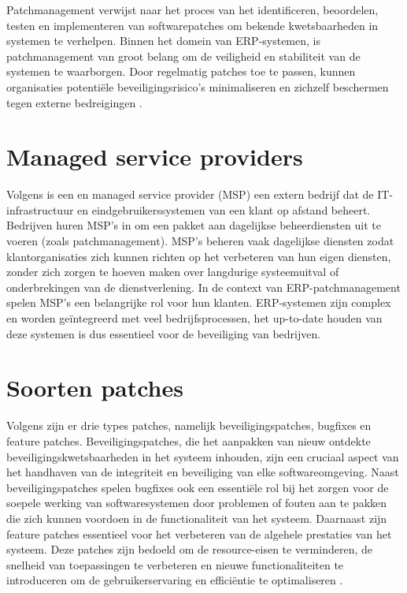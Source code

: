 Patchmanagement verwijst naar het proces van het identificeren, beoordelen, testen en implementeren van softwarepatches om bekende kwetsbaarheden in systemen te verhelpen. Binnen het domein van ERP-systemen, is patchmanagement van groot belang
om de veiligheid en stabiliteit van de systemen te waarborgen. Door regelmatig patches toe te passen, kunnen organisaties potentiële beveiligingsrisico's minimaliseren en zichzelf beschermen tegen externe bedreigingen \autocite{Buenning2024}.

\section{Managed service providers}

Volgens \textcite{Gillis2021} is een en managed service provider (MSP) een extern bedrijf dat de IT-infrastructuur en eindgebruikerssystemen van een klant op afstand beheert. Bedrijven huren MSP's in om een pakket aan dagelijkse beheerdiensten uit te voeren (zoals patchmanagement). MSP's beheren
vaak dagelijkse diensten zodat klantorganisaties zich kunnen richten op het verbeteren van hun eigen diensten, zonder zich zorgen te hoeven maken over langdurige systeemuitval of onderbrekingen van de dienstverlening.
In de context van ERP-patchmanagement spelen MSP's een belangrijke rol voor hun klanten. ERP-systemen zijn complex en worden geïntegreerd met veel bedrijfsprocessen, het up-to-date houden van deze systemen is dus essentieel voor de beveiliging van bedrijven. \autocite{Gillis2021}

\section{Soorten patches}
Volgens \textcite{Buenning2024} zijn er drie types patches, namelijk beveiligingspatches, bugfixes en feature patches. Beveiligingspatches, die het aanpakken van nieuw ontdekte beveiligingskwetsbaarheden in het systeem inhouden, zijn een cruciaal
aspect van het handhaven van de integriteit en beveiliging van elke softwareomgeving. Naast beveiligingspatches spelen bugfixes ook een essentiële rol bij het zorgen
voor de soepele werking van softwaresystemen door problemen of fouten aan te pakken die zich kunnen voordoen in de functionaliteit van het systeem. Daarnaast zijn feature patches essentieel voor het verbeteren van de algehele prestaties van het systeem. Deze patches zijn bedoeld om de resource-eisen te
verminderen, de snelheid van toepassingen te verbeteren en nieuwe functionaliteiten te introduceren om de gebruikerservaring en efficiëntie te optimaliseren \autocite{Buenning2024}. \\


